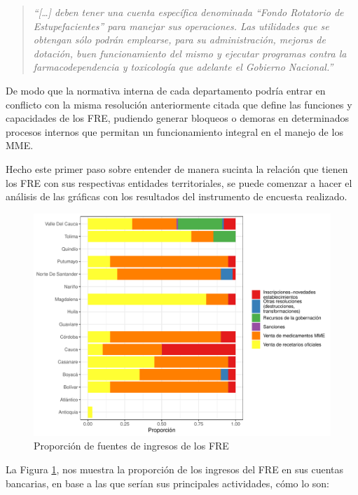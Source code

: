 \documentclass[
]{book}
\begin{document}
\begin{quote}
\emph{``{[}\ldots{]} deben tener una cuenta específica denominada ``Fondo Rotatorio de Estupefacientes'' para manejar sus operaciones. Las utilidades que se obtengan sólo podrán emplearse, para su administración, mejoras de dotación, buen funcionamiento del mismo y ejecutar programas contra la farmacodependencia y toxicología que adelante el Gobierno Nacional.''}
\end{quote}

De modo que la normativa interna de cada departamento podría entrar en conflicto con la misma resolución anteriormente citada que define las funciones y capacidades de los FRE, pudiendo generar bloqueos o demoras en determinados procesos internos que permitan un funcionamiento integral en el manejo de los MME.

Hecho este primer paso sobre entender de manera sucinta la relación que tienen los FRE con sus respectivas entidades territoriales, se puede comenzar a hacer el análisis de las gráficas con los resultados del instrumento de encuesta realizado.

\begin{figure}

{\centering \includegraphics[width=0.85\linewidth]{InformeFinal_files/figure-latex/IngresosFRE1-1} 

}

\caption{Proporción de fuentes de ingresos de los FRE}\label{fig:IngresosFRE1}
\end{figure}

La Figura \ref{fig:IngresosFRE1}, nos muestra la proporción de los ingresos del FRE en sus cuentas bancarias, en base a las que serían sus principales actividades, cómo lo son:
\end{document}
